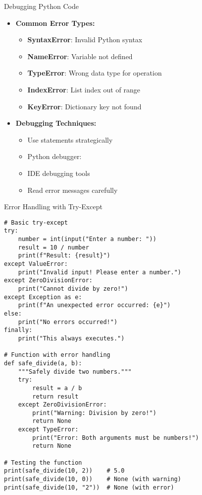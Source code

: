\begin{frame}{Debugging Python Code}
    \begin{itemize}
        \item \textbf{Common Error Types:}
        \begin{itemize}
            \item \textbf{SyntaxError}: Invalid Python syntax
            \item \textbf{NameError}: Variable not defined
            \item \textbf{TypeError}: Wrong data type for operation
            \item \textbf{IndexError}: List index out of range
            \item \textbf{KeyError}: Dictionary key not found
        \end{itemize}
        
        \item \textbf{Debugging Techniques:}
        \begin{itemize}
            \item Use  statements strategically
            \item Python debugger: 
            \item IDE debugging tools
            \item Read error messages carefully
        \end{itemize}
    \end{itemize}
\end{frame}

\begin{frame}[fragile]{Error Handling with Try-Except}
    \begin{codeblock}
        \begin{lstlisting}
# Basic try-except
try:
    number = int(input("Enter a number: "))
    result = 10 / number
    print(f"Result: {result}")
except ValueError:
    print("Invalid input! Please enter a number.")
except ZeroDivisionError:
    print("Cannot divide by zero!")
except Exception as e:
    print(f"An unexpected error occurred: {e}")
else:
    print("No errors occurred!")
finally:
    print("This always executes.")

# Function with error handling
def safe_divide(a, b):
    """Safely divide two numbers."""
    try:
        result = a / b
        return result
    except ZeroDivisionError:
        print("Warning: Division by zero!")
        return None
    except TypeError:
        print("Error: Both arguments must be numbers!")
        return None

# Testing the function
print(safe_divide(10, 2))    # 5.0
print(safe_divide(10, 0))    # None (with warning)
print(safe_divide(10, "2"))  # None (with error)
        \end{lstlisting}
    \end{codeblock}
\end{frame}
